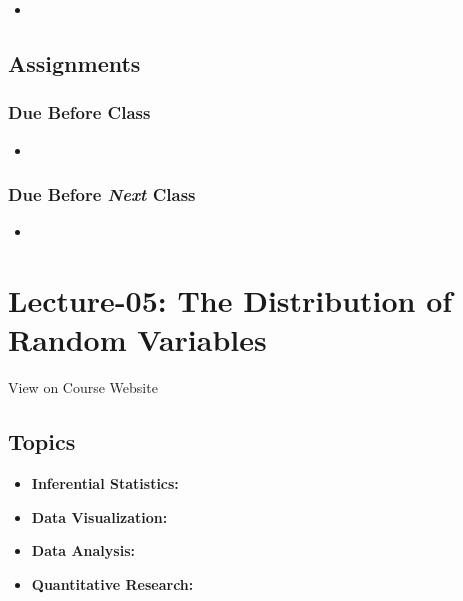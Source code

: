 \documentclass[]{book}
\providecommand{\tightlist}{%
  \setlength{\itemsep}{0pt}\setlength{\parskip}{0pt}}
\theoremstyle{definition}
\theoremstyle{definition}
\theoremstyle{definition}
\theoremstyle{remark}
\begin{document}
\begin{itemize}
\item
\end{itemize}

\subsection*{Assignments}\label{assignments-5}

\subsubsection*{Due Before Class}\label{due-before-class-3}

\begin{itemize}
\item
\end{itemize}

\subsubsection*{\texorpdfstring{Due Before \emph{Next}
Class}{Due Before Next Class}}\label{due-before-next-class-4}

\begin{itemize}
\item
\end{itemize}

\section{Lecture-05: The Distribution of Random
Variables}\label{lecture-05-the-distribution-of-random-variables}

View on Course Website

\subsection*{Topics}\label{topics-5}

\begin{itemize}
\tightlist
\item
  \textbf{Inferential Statistics:}
\item
  \textbf{Data Visualization:}
\item
  \textbf{Data Analysis:}
\item
  \textbf{Quantitative Research:}
\end{itemize}
\end{document}
